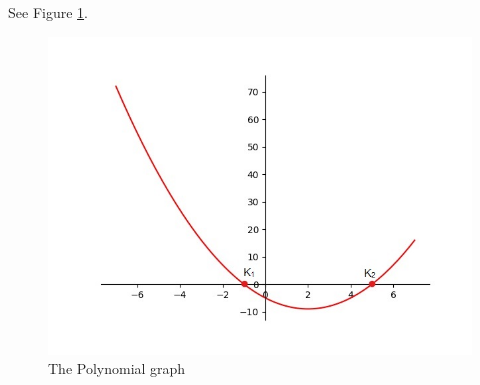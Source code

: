 \documentclass[journal,12pt,twocolumn]{article}\usepackage[margin=1.25 in]{geometry}
\begin{document}
\noindent See Figure
	  \ref{InkedFigure_1_py_LI.jpg}.
  \begin{figure}
	  \centering 
	  \includegraphics[width=\columnwidth]{InkedFigure_1_py_LI.jpg}
	  \caption{The Polynomial graph}
	  \label{InkedFigure_1_py_LI.jpg}
	  \end{figure}
\end{document}
